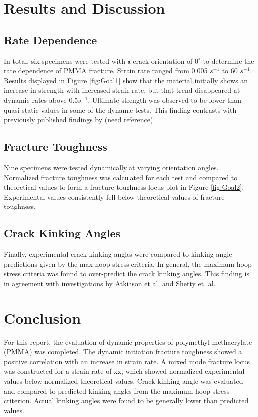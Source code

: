 \documentclass[12pt]{article}
\begin{document}
\section{Results and Discussion} %
\subsection{Rate Dependence}
In total, six specimens were tested with a crack orientation of $0^{\circ}$ to determine the rate dependence of PMMA fracture. Strain rate ranged from 0.005 $s^{-1}$ to 60 $s^{-1}$. Results displayed in Figure \ref{fig:Goal1} show that the material initially shows an increase in strength with increased strain rate, but that trend disappeared at dynamic rates above 0.5$s^{-1}$. Ultimate strength was observed to be lower than quasi-static values in some of the dynamic tests. This finding contrasts with previously published findings by (need reference) 
\subsection{Fracture Toughness}
Nine specimens were tested dynamically at varying orientation angles. Normalized fracture toughness was calculated for each test and compared to theoretical values to form a fracture toughness locus plot in Figure \ref{fig:Goal2}. Experimental values consistently fell below theoretical values of fracture toughness. 
\subsection{Crack Kinking Angles}
Finally, experimental crack kinking angles were compared to kinking angle predictions given by the max hoop stress criteria.  In general, the maximum hoop stress criteria was found to over-predict the crack kinking angles. This finding is in agreement with investigations by Atkinson et al. and Shetty et. al.




\section{Conclusion} %
For this report, the evaluation of dynamic properties of polymethyl methacrylate (PMMA) was completed. The dynamic initiation fracture toughness showed a positive correlation with an increase in strain rate. A mixed mode fracture locus was constructed for a strain rate of xx, which showed normalized experimental values below normalized theoretical values. Crack kinking angle was evaluated and compared to predicted kinking angles from the maximum hoop stress criterion. Actual kinking angles were found to be generally lower than predicted values.
\end{document}
